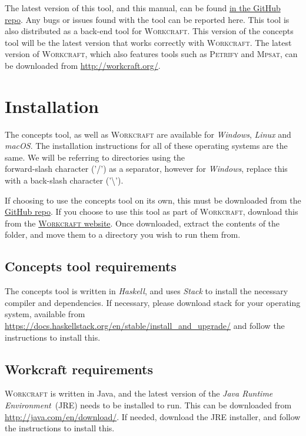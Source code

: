 \documentclass{proc}
\newcommand{\noun}[1]{\textsc{#1}}
\begin{document}
The latest version of this tool, and this manual, can be found \href{https://github.com/tuura/concepts}{in the GitHub repo}. Any bugs or issues found with the tool can be reported here. 
This tool is also distributed as a back-end tool for \noun{Workcraft}. This version of the concepts tool will be the latest version that works correctly with \noun{Workcraft}. The latest 
version of \noun{Workcraft}, which also features tools  such as \noun{Petrify} and \noun{Mpsat}, can be downloaded from \url{http://workcraft.org/}. 

\section{Installation}

The concepts tool, as well as \noun{Workcraft} are available for \emph{Windows}, \emph{Linux} and \emph{macOS}. The installation instructions for all of these operating systems are 
the same. We will be referring to directories using the \\forward-slash character ('/') as a separator, however for \emph{Windows}, replace this with a back-slash character 
('\textbackslash').

If choosing to use the concepts tool on its own, this must be 
downloaded from the \href{https://github.com/tuura/concepts}{GitHub repo}. If you choose to use this tool as part of \noun{Workcraft}, download this from the 
\href{http://workcraft.org/}{\noun{Workcraft} website}. Once downloaded, extract the contents of the folder, and move them to a directory you wish to run them from. 

\subsection{Concepts tool requirements\label{sub:Concepts_requirements}}

The concepts tool is written in \emph{Haskell}, and uses \emph{Stack} to install the necessary compiler and dependencies. If necessary, please download stack for your operating 
system, available from \\\url{https://docs.haskellstack.org/en/stable/install_and_upgrade/} and follow the instructions to install this.

\subsection{Workcraft requirements}

\noun{Workcraft} is written in Java, and the latest version of the \emph{Java Runtime Environment}~(JRE) needs to be installed to run.  This can be downloaded from 
\url{http://java.com/en/download/}. If needed, download the JRE installer, and follow the instructions to install this.
\end{document}
